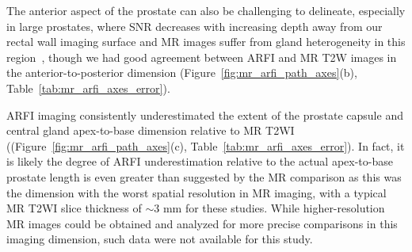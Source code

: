 The anterior aspect of the prostate can also be challenging to delineate,
especially in large prostates, where SNR decreases with increasing depth away
from our rectal wall imaging surface and MR images suffer from gland
heterogeneity in this region~\cite{Gupta2013}, though we had good agreement
between ARFI and MR T2W images in the anterior-to-posterior dimension
(Figure~\ref{fig:mr_arfi_path_axes}(b), Table~\ref{tab:mr_arfi_axes_error}).

ARFI imaging consistently underestimated the extent of the prostate capsule and
central gland apex-to-base dimension relative to MR T2WI
((Figure~\ref{fig:mr_arfi_path_axes}(c), Table~\ref{tab:mr_arfi_axes_error}).
In fact, it is likely the degree of ARFI underestimation relative to the actual
apex-to-base prostate length is even greater than suggested by the MR
comparison as this was the dimension with the worst spatial resolution in MR
imaging, with a typical MR T2WI slice thickness of $\sim$3 mm for these
studies.  While higher-resolution MR images could be obtained and analyzed for
more precise comparisons in this imaging dimension, such data were not available
for this study. 
